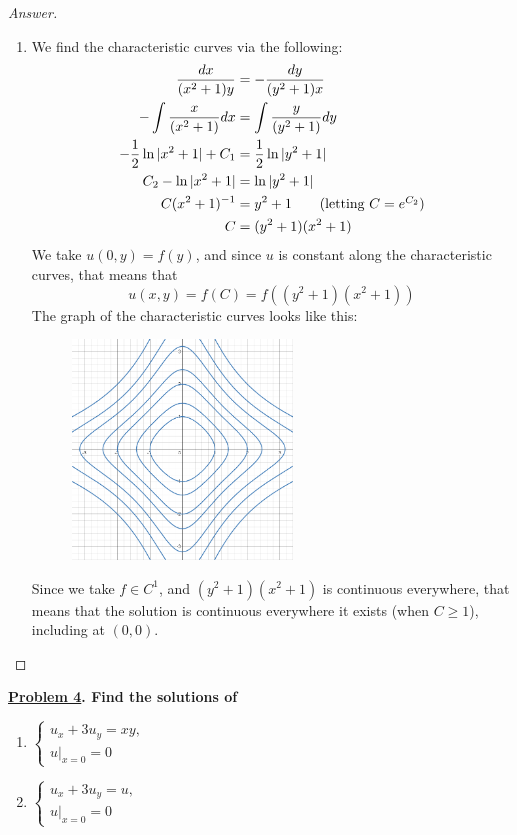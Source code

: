 \documentclass{article}
\theoremstyle{definition}
\renewcommand\qedsymbol{$\blacksquare$}
\newenvironment{ans}{\begin{proof}[Answer]\renewcommand{\qedsymbol}{}}{\end{proof}}
\newenvironment{boldenv}{\bfseries\boldmath}{}
\begin{document}
\begin{ans}
\begin{enumerate}[resume*=answers]
			\item We find the characteristic curves via the following:
            \begin{align*}
                \frac{dx}{(x^2+1)y} &= -\frac{dy}{(y^2+1)x}\\
                -\int \frac{x}{(x^2+1)}dx &= \int\frac{y}{(y^2+1)}dy\\
                -\frac{1}{2}\ln|x^2+1| + C_1 &= \frac{1}{2}\ln|y^2+1|\\
                C_2 - \ln|x^2+1| &= \ln|y^2+1|\\
                C(x^2+1)^{-1} &= y^2+1 \tag{letting $C = e^{C_2}$}\\
                C &= (y^2+1)(x^2+1)
            \end{align*}
            We take $u(0,y) = f(y)$, and since $u$ is constant along the characteristic curves, that means that
            \[\boxed{u(x,y) = f(C) = f\left((y^2+1)(x^2+1)\right)}\]
            The graph of the characteristic curves looks like this:
            \begin{figure}[H]
                \centering
                \includegraphics[width=2.3in]{19 graph.png}
            \end{figure}
            Since we take $f\in C^1$, and $(y^2+1)(x^2+1)$ is continuous everywhere, that means that the solution is continuous everywhere it exists (when $C \geq 1$), including at $(0,0)$.\\

            
		\end{enumerate}
	\end{ans}
	
	\begin{boldenv}
		\underline{Problem 4}. Find the solutions of
		\begin{enumerate}[resume*=problems]
			\item $\begin{cases}
			    u_x + 3u_y = xy,\\
                u|_{x=0} = 0
			\end{cases}$
			\item $\begin{cases}
			    u_x + 3u_y = u,\\
                u|_{x=0} = 0
			\end{cases}$
		\end{enumerate}
	\end{boldenv}
	
\end{document}

